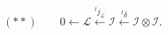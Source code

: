 \(\displaystyle
(\ast\ast)\qquad
0 \longleftarrow \mathcal L
  \xleftarrow{{}^{t}\!j_{\mathcal L}}
\mathcal I
  \xleftarrow{{}^{t}\!\delta}
\mathcal I\otimes\mathcal I .
\)
